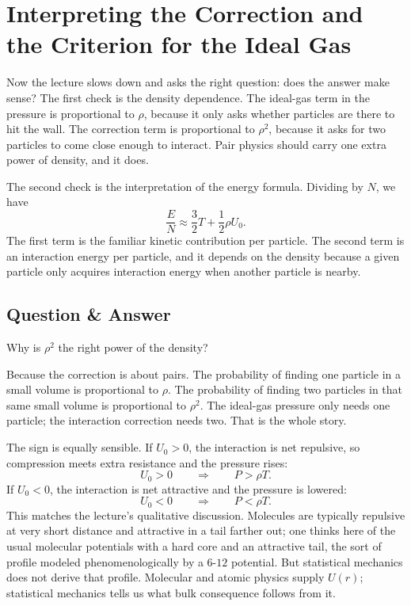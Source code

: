 \section{Interpreting the Correction and the Criterion for the Ideal Gas}

Now the lecture slows down and asks the right question: does the answer make sense? The first check is the density dependence. The ideal-gas term in the pressure is proportional to \(\rho\), because it only asks whether particles are there to hit the wall. The correction term is proportional to \(\rho^2\), because it asks for two particles to come close enough to interact. Pair physics should carry one extra power of density, and it does.

The second check is the interpretation of the energy formula. Dividing by \(N\), we have
\begin{equation}
\frac{E}{N}\approx \frac{3}{2}T+\frac{1}{2}\rho U_0.
\end{equation}
The first term is the familiar kinetic contribution per particle. The second term is an interaction energy per particle, and it depends on the density because a given particle only acquires interaction energy when another particle is nearby.

\subsection{Question \& Answer}

Why is \(\rho^2\) the right power of the density?

Because the correction is about pairs. The probability of finding one particle in a small volume is proportional to \(\rho\). The probability of finding two particles in that same small volume is proportional to \(\rho^2\). The ideal-gas pressure only needs one particle; the interaction correction needs two. That is the whole story.

The sign is equally sensible. If \(U_0>0\), the interaction is net repulsive, so compression meets extra resistance and the pressure rises:
\begin{equation}
U_0>0
\qquad \Longrightarrow \qquad
P>\rho T.
\end{equation}
If \(U_0<0\), the interaction is net attractive and the pressure is lowered:
\begin{equation}
U_0<0
\qquad \Longrightarrow \qquad
P<\rho T.
\end{equation}
This matches the lecture's qualitative discussion. Molecules are typically repulsive at very short distance and attractive in a tail farther out; one thinks here of the usual molecular potentials with a hard core and an attractive tail, the sort of profile modeled phenomenologically by a \(6\)-\(12\) potential. But statistical mechanics does not derive that profile. Molecular and atomic physics supply \(U(r)\); statistical mechanics tells us what bulk consequence follows from it.

